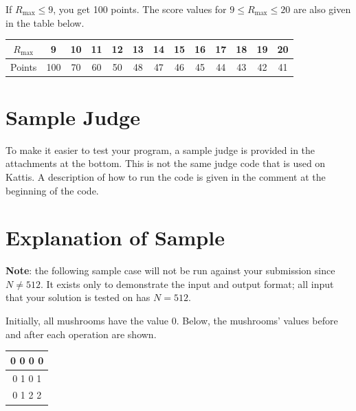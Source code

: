 If $R_{\max} \leq 9$, you get 100 points.
The score values for $9 \leq R_{\max} \leq 20$ are also given in the table below.

\begin{center}
\begin{tabular}{|c|c|c|c|c|c|c|c|c|c|c|c|c|}
  \hline
  $R_{\text{max}}$ & 9 & 10 & 11 & 12 & 13 & 14 & 15 & 16 & 17 & 18 & 19 & 20 \\ \hline
  Points & 100 & 70 & 60 & 50 & 48 & 47 & 46 & 45 & 44 & 43 & 42 & 41 \\ \hline
\end{tabular}
\end{center}

\section*{Sample Judge}
To make it easier to test your program, a sample judge is provided in the attachments at the bottom.
This is not the same judge code that is used on Kattis.
A description of how to run the code is given in the comment at the beginning of the code.

\section*{Explanation of Sample}

\textbf{Note}: the following sample case will not be run against your submission since $N \neq 512$.
It exists only to demonstrate the input and output format; all input that your solution is tested on has $N = 512$.

Initially, all mushrooms have the value $0$.
Below, the mushrooms' values before and after each operation are shown.

\begin{center}
  \noindent
  \begin{tabular}{|c|}
    \hline
    0 0 0 0\\ \hline
    0 1 0 1\\ \hline
    0 1 2 2\\ \hline
  \end{tabular}
\end{center}
